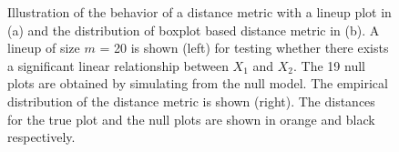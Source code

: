 \documentclass[12]{article}
\begin{document}
\begin{figure}[hbtp]
\centering
{}
\label{dist2}
	\vspace{-.1in}
\caption[Optional caption for list of figures]{Illustration of the behavior of a distance metric with a lineup plot in (a) and the distribution of boxplot based distance metric in (b). A lineup of size $m$ = 20 is shown (left) for testing whether there exists a significant linear relationship between $X_1$ and $X_2$. The 19 null plots are obtained by simulating from the null model.  The empirical distribution of the distance metric is shown (right). The distances for the true plot and the null plots are shown in orange and black respectively.}
\end{figure}
\end{document}
